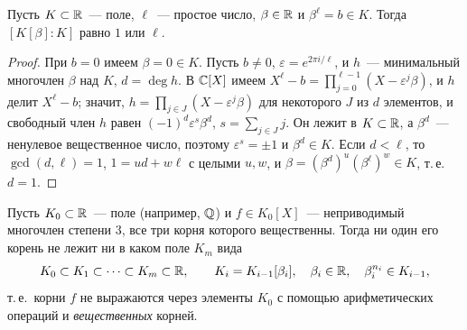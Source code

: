 \begin{lemma}[3.22e]
Пусть $K\subset\mathbb R$~--- поле, $\ell$~--- простое число, $\beta\in\mathbb R$ и $\beta^\ell=b\in K$. Тогда $[K[\beta]:K]$ равно $1$ или $\ell$.
\end{lemma}

\begin{proof}
При $b=0$ имеем $\beta=0\in K$. Пусть $b\ne0$, $\varepsilon=e^{2\pi i/\ell}$, и $h$~--- минимальный многочлен $\beta$ над $K$, $d=\deg h$.
В $\mathbb C[X]$ имеем $X^\ell-b=\prod_{j=0}^{\ell-1}(X-\varepsilon^j\beta)$, и $h$ делит $X^\ell-b$; значит, $h=\prod_{j\in J}(X-\varepsilon^j\beta)$
для некоторого $J$ из $d$ элементов, и свободный член $h$ равен $(-1)^d\varepsilon^s\beta^d$, $s=\sum_{j\in J}j$. Он лежит в $K\subset\mathbb R$, а
$\beta^d$~--- ненулевое вещественное число, поэтому $\varepsilon^s=\pm1$ и $\beta^d\in K$. Если $d<\ell$, то $\gcd(d,\ell)=1$, $1=ud+w\ell$
с целыми $u,w$, и $\beta=(\beta^d)^u(\beta^\ell)^w\in K$, т.\,е.\ $d=1$.
\end{proof}

\begin{proposition}
Пусть $K_0\subset\mathbb R$~--- поле (например, $\mathbb Q$) и $f\in K_0[X]$~--- неприводимый многочлен степени $3$, все три корня
которого вещественны. Тогда ни один его корень не лежит ни в каком поле $K_m$ вида
\[
K_0\subset K_1\subset\dots\subset K_m\subset\mathbb R,\qquad K_i=K_{i-1}[\beta_i],\quad\beta_i\in\mathbb R,\quad\beta_i^{n_i}\in K_{i-1},
\]
т.\,е.\ корни $f$ не выражаются через элементы $K_0$ с помощью арифметических операций и \emph{вещественных} корней.
\end{proposition}

